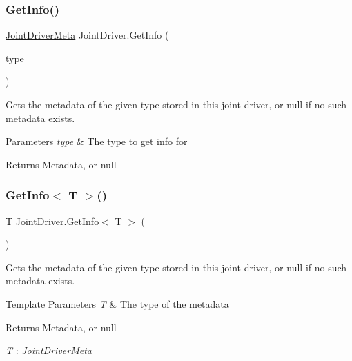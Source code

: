 \subsubsection{\texorpdfstring{Get\+Info()}{GetInfo()}}
{\footnotesize\ttfamily \hyperlink{class_joint_driver_meta}{Joint\+Driver\+Meta} Joint\+Driver.\+Get\+Info (\begin{DoxyParamCaption}\item[{System.\+Type}]{type }\end{DoxyParamCaption})}



Gets the metadata of the given type stored in this joint driver, or null if no such metadata exists. 


\begin{DoxyParams}{Parameters}
{\em type} & The type to get info for\\
\hline
\end{DoxyParams}
\begin{DoxyReturn}{Returns}
Metadata, or null
\end{DoxyReturn}
\mbox{\label{class_joint_driver_af4a1c0ffdb06dcd0dea4b2a7524fb1c8}} 
\subsubsection{\texorpdfstring{Get\+Info$<$ T $>$()}{GetInfo< T >()}}
{\footnotesize\ttfamily T \hyperlink{class_joint_driver_ab791d90626a1821f03329d65ccbe3e74}{Joint\+Driver.\+Get\+Info}$<$ T $>$ (\begin{DoxyParamCaption}{ }\end{DoxyParamCaption})}



Gets the metadata of the given type stored in this joint driver, or null if no such metadata exists. 


\begin{DoxyTemplParams}{Template Parameters}
{\em T} & The type of the metadata\\
\hline
\end{DoxyTemplParams}
\begin{DoxyReturn}{Returns}
Metadata, or null
\end{DoxyReturn}
\begin{Desc}
\item[Type Constraints]\begin{description}
\item[{\em T} : {\em \hyperlink{class_joint_driver_meta}{Joint\+Driver\+Meta}}]\end{description}
\end{Desc}
\mbox{\label{class_joint_driver_a1db6f1668ea9122fb0e5d3f0aaa3f621}} 

